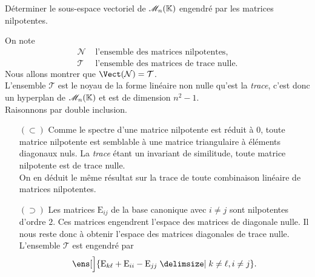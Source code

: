 \begin{exercice}
    Déterminer le sous-espace vectoriel de $\mathscr{M}_n(\mathbb{K})$ engendré par les matrices nilpotentes.
\end{exercice}

\begin{solution}
    On note 
    \begin{align*}
        \mathcal{N} & \text{ l'ensemble des matrices nilpotentes}, \\
        \mathcal{T} & \text{ l'ensemble des matrices de trace nulle.}
    \end{align*}
    Nous allons montrer que $\Vect(\mathcal{N}) = \mathcal{T}$. \\
    L'ensemble $\mathcal{T}$ est le noyau de la forme linéaire non nulle qu'est la \emph{trace}, c'est donc un hyperplan de $\mathscr{M}_n(\mathbb{K})$ et est de dimension $n^2-1$. \\
    Raisonnons par double inclusion.
    \begin{itemize}
        \item[$(\subset)$] Comme le spectre d'une matrice nilpotente est réduit à $0$, toute matrice nilpotente est semblable à une matrice triangulaire à éléments diagonaux nuls. La \emph{trace} étant un invariant de similitude, toute matrice nilpotente est de trace nulle. \\
        On en déduit le même résultat sur la trace de toute combinaison linéaire de matrices nilpotentes.
        \item[$(\supset)$] Les matrices $\mathrm{E}_{ij}$ de la base canonique avec $i \not= j$ sont nilpotentes d'ordre $2$. Ces matrices engendrent l'espace des matrices de diagonale nulle. Il nous reste donc à obtenir l'espace des matrices diagonales de trace nulle. L'ensemble $\mathcal{T}$ est engendré par
        $$\ens[\Big]{\mathrm{E}_{k \ell} + \mathrm{E}_{ii} - \mathrm{E}_{jj} \tq k \not= \ell, i \not= j }.$$

\end{itemize}
\end{solution}
